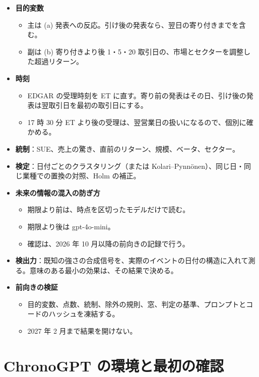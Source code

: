 \documentclass[xelatex,ja=standard,jafont=haranoaji,a4paper,10pt]{bxjsarticle}
\begin{document}
\begin{itemize}
\item \textbf{目的変数}
  \begin{itemize}
  \item 主は (a) 発表への反応。引け後の発表なら、翌日の寄り付きまでを含む。
  \item 副は (b) 寄り付きより後 1・5・20 取引日の、市場とセクターを調整した超過リターン。
  \end{itemize}
\item \textbf{時刻}
  \begin{itemize}
  \item EDGAR の受理時刻を ET に直す。寄り前の発表はその日、引け後の発表は翌取引日を最初の取引日にする。
  \item 17 時 30 分 ET より後の受理は、翌営業日の扱いになるので、個別に確かめる。
  \end{itemize}
\item \textbf{統制}：SUE、売上の驚き、直前のリターン、規模、ベータ、セクター。
\item \textbf{検定}：日付ごとのクラスタリング（または Kolari--Pynnönen）、同じ日・同じ業種での置換の対照、Holm の補正。
\item \textbf{未来の情報の混入の防ぎ方}
  \begin{itemize}
  \item 期限より前は、時点を区切ったモデルだけで読む。
  \item 期限より後は gpt-4o-mini。
  \item 確認は、2026 年 10 月以降の前向きの記録で行う。
  \end{itemize}
\item \textbf{検出力}：既知の強さの合成信号を、実際のイベントの日付の構造に入れて測る。意味のある最小の効果は、その結果で決める。
\item \textbf{前向きの検証}
  \begin{itemize}
  \item 目的変数、点数、統制、除外の規則、窓、判定の基準、プロンプトとコードのハッシュを凍結する。
  \item 2027 年 2 月まで結果を開けない。
  \end{itemize}
\end{itemize}

\section{ChronoGPT の環境と最初の確認}
\end{document}
